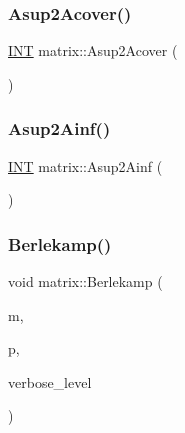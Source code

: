 \mbox{\label{classmatrix_a606cce1a9d6430b751090e27ef31d2e4}} 
\subsubsection{\texorpdfstring{Asup2\+Acover()}{Asup2Acover()}}
{\footnotesize\ttfamily \mbox{\hyperlink{galois_8h_a09fddde158a3a20bd2dcadb609de11dc}{I\+NT}} matrix\+::\+Asup2\+Acover (\begin{DoxyParamCaption}{ }\end{DoxyParamCaption})}

\mbox{\label{classmatrix_a6ec12bab511dbb2f1426515819359390}} 
\subsubsection{\texorpdfstring{Asup2\+Ainf()}{Asup2Ainf()}}
{\footnotesize\ttfamily \mbox{\hyperlink{galois_8h_a09fddde158a3a20bd2dcadb609de11dc}{I\+NT}} matrix\+::\+Asup2\+Ainf (\begin{DoxyParamCaption}{ }\end{DoxyParamCaption})}

\mbox{\label{classmatrix_ac98dd867d9148831126eaddd13b7da60}} 
\subsubsection{\texorpdfstring{Berlekamp()}{Berlekamp()}}
{\footnotesize\ttfamily void matrix\+::\+Berlekamp (\begin{DoxyParamCaption}\item[{\mbox{\hyperlink{classunipoly}{unipoly}} \&}]{m,  }\item[{\mbox{\hyperlink{galois_8h_a09fddde158a3a20bd2dcadb609de11dc}{I\+NT}}}]{p,  }\item[{\mbox{\hyperlink{galois_8h_a09fddde158a3a20bd2dcadb609de11dc}{I\+NT}}}]{verbose\+\_\+level }\end{DoxyParamCaption})}

\mbox{\label{classmatrix_af3908604699f48d25012d6500de591f0}} 
